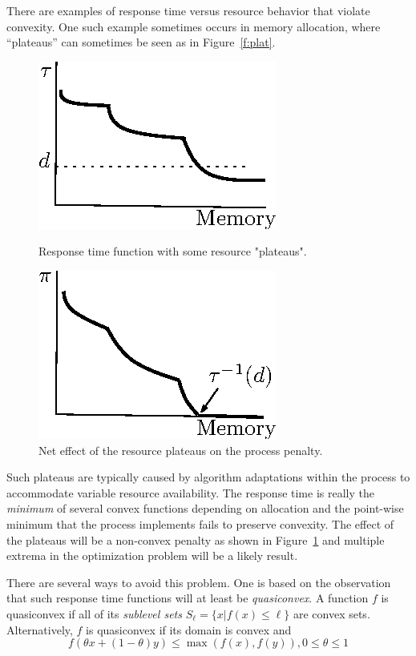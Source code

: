 There are examples of response time versus resource behavior that violate convexity.  One such example sometimes occurs in memory allocation, where “plateaus” can sometimes be seen as in Figure~\ref{f:plat}.
\begin{figure}[b]
\parbox{1.6in}{
\includegraphics*{Plateau1.eps}
\caption{\label{f:plat}Response time function with some resource "plateaus".}
}
\hspace{\fill}
\parbox{1.6in}{
\includegraphics*{Plateau2.eps}
\caption{\label{f:plateffect}Net effect of the resource plateaus on the process penalty.}
}
\end{figure}
Such plateaus are typically caused by algorithm adaptations within the process to accommodate variable resource availability.  The response time is really the \emph{minimum} of several convex functions depending on allocation and the point-wise minimum that the process implements fails to preserve convexity.  The effect of the plateaus will be a non-convex penalty as shown in Figure~\ref{f:plateffect} and multiple extrema in the optimization problem will be a likely result.

There are several ways to avoid this problem.  One is based on the observation that such response time functions
will at least be \emph{quasiconvex}.  A function $f$ is quasiconvex if all of its \emph{sublevel sets}
$S_\ell = \{x | f(x) \leq \ell\}$ are convex sets.
Alternatively, $f$ is quasiconvex if its domain is convex and
\begin{displaymath}
f(\theta x + (1-\theta)y) \leq \max(f(x),f(y)), 0 \leq \theta \leq 1
\end{displaymath}

